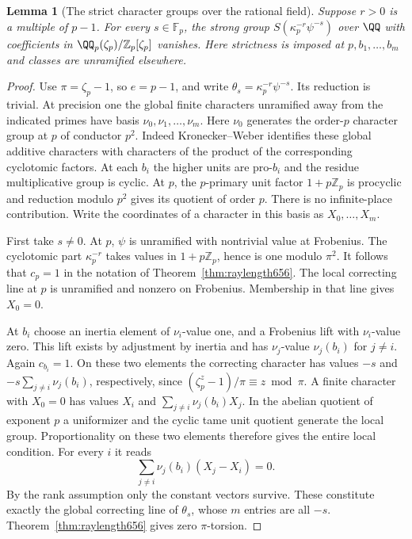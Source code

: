 \documentclass[a4paper,11pt]{article}
\newtheorem{lemma}[proposition]{Lemma}
\theoremstyle{definition}
\theoremstyle{remark}
\newcommand{\ZZ}{\mathbb Z}\newcommand{\ord}{\operatorname{ord}}
\numberwithin{equation}{section}
\begin{document}
\begin{lemma}[The strict character groups over the rational field]
\leavevmode\label{lem:scalarcyclic657}
Suppose \(r>0\) is a multiple of \(p-1\). For every
\(s\in\mathbb F_p\), the strong group \(S(\kappa_p^{-r}\psi^{-s})\)
over \(\QQ\) with coefficients in \(\QQ_p(\zeta_p)/\ZZ_p[\zeta_p]\)
vanishes. Here strictness is imposed at \(p,b_1,\ldots,b_m\)
and classes are unramified elsewhere.
\end{lemma}
\begin{proof}
Use \(\pi=\zeta_p-1\), so \(e=p-1\), and write
\(\theta_s=\kappa_p^{-r}\psi^{-s}\). Its reduction is trivial.
At precision one the global finite characters unramified away
from the indicated primes have basis \(\nu_0,\nu_1,\ldots,\nu_m\).
Here \(\nu_0\) generates the order-\(p\) character group at
\(p\) of conductor \(p^2\). Indeed Kronecker--Weber identifies
these global additive characters with characters of the product of
the corresponding cyclotomic factors. At each \(b_i\) the higher
units are pro-\(b_i\) and the residue multiplicative group is cyclic.
At \(p\), the \(p\)-primary unit factor \(1+p\ZZ_p\) is procyclic
and reduction modulo \(p^2\) gives its quotient of order \(p\).
There is no infinite-place contribution. Write the coordinates
of a character in this basis as \(X_0,\ldots,X_m\).

First take \(s\ne0\). At \(p\), \(\psi\) is unramified with
nontrivial value at Frobenius. The cyclotomic part
\(\kappa_p^{-r}\) takes values in \(1+p\ZZ_p\), hence is
one modulo \(\pi^2\). It follows that \(c_p=1\) in the notation
of Theorem~\ref{thm:raylength656}. The local correcting line
at \(p\) is unramified and nonzero on Frobenius. Membership
in that line gives \(X_0=0\).

At \(b_i\) choose an inertia element of \(\nu_i\)-value one,
and a Frobenius lift with \(\nu_i\)-value zero. This lift exists
by adjustment by inertia and has \(\nu_j\)-value \(\nu_j(b_i)\)
for \(j\ne i\). Again \(c_{b_i}=1\). On these two elements
the correcting character has values
\(-s\) and \(-s\sum_{j\ne i}\nu_j(b_i)\), respectively, since
\((\zeta_p^z-1)/\pi\equiv z\bmod\pi\). A finite character
with \(X_0=0\) has values \(X_i\) and
\(\sum_{j\ne i}\nu_j(b_i)X_j\). In the abelian quotient of
exponent \(p\) a uniformizer and the cyclic tame unit quotient
generate the local group. Proportionality on these two elements
therefore gives the entire local condition. For every \(i\) it reads
\[
             \sum_{j\ne i}\nu_j(b_i)(X_j-X_i)=0.
\]
By the rank assumption only the constant vectors survive.
These constitute exactly the global correcting line of
\(\theta_s\), whose \(m\) entries are all \(-s\).
Theorem~\ref{thm:raylength656} gives zero \(\pi\)-torsion.


\end{proof}
\end{document}

